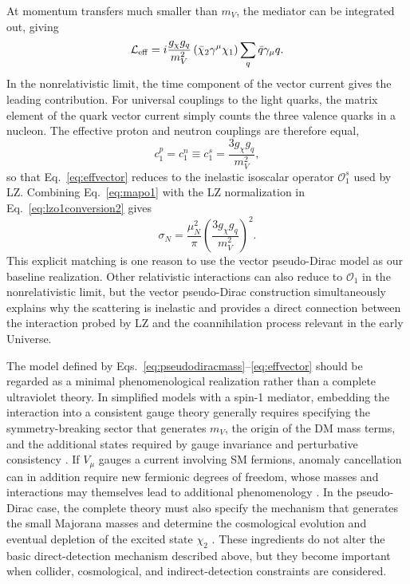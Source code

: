 \documentclass[aps,prd,reprint,superscriptaddress,nofootinbib,longbibliography,floatfix]{revtex4-2}
\begin{document}
At momentum transfers much smaller than $m_V$, the mediator can be integrated out, giving
\begin{equation}
\mathcal{L}_{\rm eff}=
i\frac{g_\chi g_q}{m_V^2}
\left(\bar\chi_2\gamma^\mu\chi_1\right)
\sum_q\bar q\gamma_\mu q.
\label{eq:effvector}
\end{equation}
In the nonrelativistic limit, the time component of the vector current gives the leading contribution. For universal couplings to the light quarks, the matrix element of the quark vector current simply counts the three valence quarks in a nucleon. The effective proton and neutron couplings are therefore equal,
\begin{equation}
c_1^p=c_1^n\equiv c_1^s=\frac{3g_\chi g_q}{m_V^2},
\label{eq:mapo1}
\end{equation}
so that Eq.~\eqref{eq:effvector} reduces to the inelastic isoscalar operator $\mathcal{O}_1^s$ used by LZ. Combining Eq.~\eqref{eq:mapo1} with the LZ normalization in Eq.~\eqref{eq:lzo1conversion2} gives
\begin{equation}
\sigma_N=\frac{\mu_N^2}{\pi}
\left(\frac{3g_\chi g_q}{m_V^2}\right)^2.
\label{eq:sigmageneric}
\end{equation}
This explicit matching is one reason to use the vector pseudo-Dirac model as our baseline realization. Other relativistic interactions can also reduce to $\mathcal{O}_1$ in the nonrelativistic limit, but the vector pseudo-Dirac construction simultaneously explains why the scattering is inelastic and provides a direct connection between the interaction probed by LZ and the coannihilation process relevant in the early Universe.

The model defined by Eqs.~\eqref{eq:pseudodiracmass}--\eqref{eq:effvector} should be regarded as a minimal phenomenological realization rather than a complete ultraviolet theory. In simplified models with a spin-1 mediator, embedding the interaction into a consistent gauge theory generally requires specifying the symmetry-breaking sector that generates $m_V$, the origin of the DM mass terms, and the additional states required by gauge invariance and perturbative consistency \cite{Kahlhoefer2016}. If $V_\mu$ gauges a current involving SM fermions, anomaly cancellation can in addition require new fermionic degrees of freedom, whose masses and interactions may themselves lead to additional phenomenology \cite{FileviezPerez2010,Duerr2014,Ekstedt2016}. In the pseudo-Dirac case, the complete theory must also specify the mechanism that generates the small Majorana masses and determine the cosmological evolution and eventual depletion of the excited state $\chi_2$ \cite{CarrilloGonzalez2021}. These ingredients do not alter the basic direct-detection mechanism described above, but they become important when collider, cosmological, and indirect-detection constraints are considered.
\end{document}
